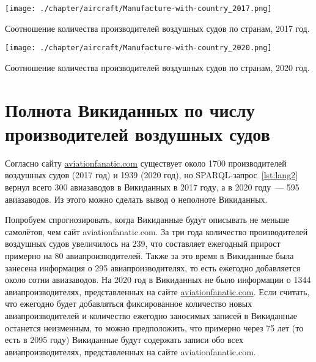 \begin{marginfigure}
\centering
	\texttt{[image: ./chapter/aircraft/Manufacture-with-country\_2017.png]}
	\caption{Соотношение количества производителей воздушных судов по странам, 2017 год.}
	\label{fig:Manufacture_with_country_2017}
\end{marginfigure}
\begin{marginfigure}
\centering
	\texttt{[image: ./chapter/aircraft/Manufacture-with-country\_2020.png]}
	\caption{Соотношение количества производителей воздушных судов по странам, 2020 год.}
	\label{fig:Manufacture_with_country_2020}
\end{marginfigure}





\section{Полнота Викиданных по числу производителей воздушных судов}

Согласно сайту \href{https://www.aviationfanatic.com/}{aviationfanatic.com} 
существует около \num{1700} 
производителей воздушных судов\autocite{count_of_aircraft_manufactures} (2017 год) 
и \num{1939} (2020 год), 
но SPARQL-запрос~\ref{lst:lang2} вернул всего 300 авиазаводов в Викиданных в 2017 году, 
а в 2020 году~--- 595 авиазаводов. Из этого можно сделать вывод о неполноте Викиданных.  

Попробуем спрогнозировать, когда Викиданные будут описывать не меньше самолётов, 
чем сайт aviationfanatic.com. 
За три года количество производителей воздушных судов увеличилось на 239, 
что составляет ежегодный прирост примерно на 80 авиапроизводителей. 
Также за это время в Викиданные была занесена информация о 295 авиапроизводителях, 
то есть ежегодно добавляется около сотни авиазаводов. 
На 2020 год в Викиданных не было информации о \num{1344} авиапроизводителях, 
представленных на сайте \href{https://www.aviationfanatic.com/}{aviationfanatic.com}. 
Если считать, что ежегодно будет добавляться фиксированное количество новых авиапроизводителей 
и количество ежегодно заносимых записей в Викиданные останется неизменным, 
то можно предположить, что примерно через 75 лет (то есть в 2095 году) 
Викиданные будут содержать записи обо всех авиапроизводителях, представленных на сайте aviationfanatic.com.

